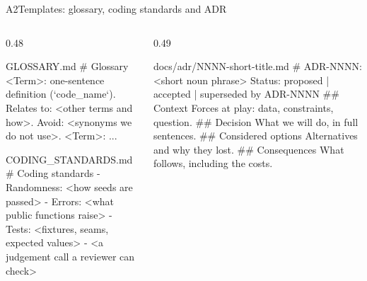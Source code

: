 \begin{frame}[fragile,source={Nygard (2011) · Pocock (2026), domain-modeling ADR format; code-review}]{A2\enspace Templates: glossary, coding standards and ADR}
  \begin{columns}[T,onlytextwidth]
    \begin{column}{0.48\textwidth}
\begin{codefile}[basicstyle=\ttfamily\fontsize{7}{8.4}\selectfont]{GLOSSARY.md}
# Glossary
<Term>: one-sentence definition (`code_name`).
  Relates to: <other terms and how>.
  Avoid: <synonyms we do not use>.
<Term>: ...
\end{codefile}
      \vskip2mm
\begin{codefile}[basicstyle=\ttfamily\fontsize{7}{8.4}\selectfont]{CODING\_STANDARDS.md}
# Coding standards
- Randomness: <how seeds are passed>
- Errors: <what public functions raise>
- Tests: <fixtures, seams, expected values>
- <a judgement call a reviewer can check>
\end{codefile}
    \end{column}
    \begin{column}{0.49\textwidth}
\begin{codefile}[basicstyle=\ttfamily\fontsize{7}{8.4}\selectfont]{docs/adr/NNNN-short-title.md}
# ADR-NNNN: <short noun phrase>
Status: proposed | accepted |
        superseded by ADR-NNNN
## Context
Forces at play: data, constraints, question.
## Decision
What we will do, in full sentences.
## Considered options
Alternatives and why they lost.
## Consequences
What follows, including the costs.
\end{codefile}
    \end{column}
  \end{columns}
\end{frame}

